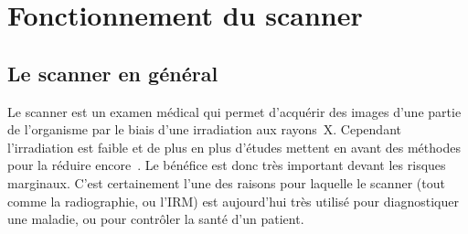 \documentclass[main.tex]{subfiles}
\begin{document}
%

\section{Fonctionnement du scanner \label{sec:fct_scan}}
\subsection{Le scanner en général}
Le scanner est un examen médical qui permet d'acquérir des images d'une partie de l'organisme par le biais d'une irradiation aux rayons~X. %
Cependant l'irradiation est faible et de plus en plus d'études mettent en avant des méthodes pour la réduire encore~\cite{mccollough2009strategies}. Le bénéfice est donc très important devant les risques marginaux. C'est certainement l'une des raisons pour laquelle le scanner (tout comme la radiographie, ou l'IRM) est aujourd'hui très utilisé pour diagnostiquer une maladie, ou %
pour contrôler la santé d'un patient.
\end{document}
